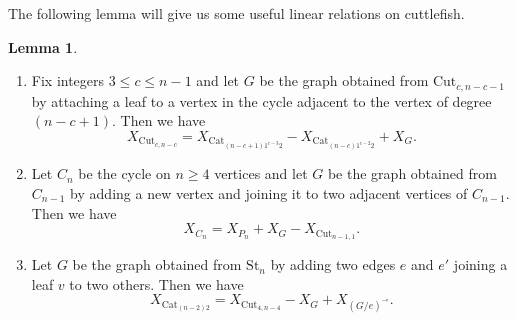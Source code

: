 \documentclass[12pt]{amsart}  %
\theoremstyle{definition}
\newtheorem{lemma}[theorem]{Lemma}
\theoremstyle{remark}
\numberwithin{equation}{section}
\begin{document}
The following lemma will give us some useful linear relations on cuttlefish.

\begin{lemma}\label{lem:cutrelations}\hspace{0pt}
\begin{enumerate}
\item Fix integers $3\leq c\leq n-1$ and let $G$ be the graph obtained from $\text{Cut}_{c,n-c-1}$ by attaching a leaf to a vertex in the cycle adjacent to the vertex of degree $(n-c+1)$. Then we have
\begin{equation}
X_{\text{Cut}_{c,n-c}}=X_{\text{Cat}_{(n-c+1)1^{c-3}2}}-X_{\text{Cat}_{(n-c)1^{c-2}2}}+X_G.
\end{equation}
\item Let $C_n$ be the cycle on $n\geq 4$ vertices and let $G$ be the graph obtained from $C_{n-1}$ by adding a new vertex and joining it to two adjacent vertices of $C_{n-1}$. Then we have
\begin{equation}
X_{C_n}=X_{P_n}+X_G-X_{\text{Cut}_{n-1,1}}.
\end{equation}
\item Let $G$ be the graph obtained from $\text{St}_n$ by adding two edges $e$ and $e'$ joining a leaf $v$ to two others. Then we have
\begin{equation}
X_{\text{Cat}_{(n-2)2}}=X_{\text{Cut}_{4,n-4}}-X_G+X_{(G/e)^\multimap}.
\end{equation}
\end{enumerate}
\end{lemma}
\end{document}
